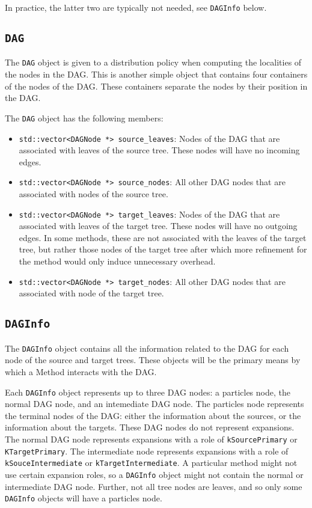 \noindent In practice, the latter two are typically not needed, see
\texttt{DAGInfo} below.


\subsection{\texttt{DAG}}

The \texttt{DAG} object is given to a distribution policy when computing the
localities of the nodes in the DAG. This is another simple object that contains
four containers of the nodes of the DAG. These containers separate the nodes
by their position in the DAG.

The \texttt{DAG} object has the following members:

\begin{itemize}
  \item \texttt{std::vector<DAGNode *> source\_leaves}: Nodes of the DAG that
    are associated with leaves of the source tree. These nodes will have no
    incoming edges.
  \item \texttt{std::vector<DAGNode *> source\_nodes}: All other DAG nodes that
    are associated with nodes of the source tree.
  \item \texttt{std::vector<DAGNode *> target\_leaves}: Nodes of the DAG that are
    associated with leaves of the target tree. These nodes will have no outgoing
    edges. In some methods, these are not associated with the leaves of the
    target tree, but rather those nodes of the target tree after which more
    refinement for the method would only induce unnecessary overhead.
  \item \texttt{std::vector<DAGNode *> target\_nodes}: All other DAG nodes that
    are associated with node of the target tree.
\end{itemize}


\subsection{\texttt{DAGInfo}}

The \texttt{DAGInfo} object contains all the information related to the DAG
for each node of the source and target trees. These objects will be the
primary means by which a Method interacts with the DAG.

Each \texttt{DAGInfo} object represents up to three DAG nodes: a particles
node, the normal DAG node, and an intemediate DAG node. The particles node
represents the terminal nodes of the DAG: either the information about
the sources, or the information about the targets. These DAG nodes do not
represent expansions. The normal
DAG node represents expansions with a role of \texttt{kSourcePrimary} or
\texttt{KTargetPrimary}. The intermediate node represents expansions with a
role of \texttt{kSouceIntermediate} or \texttt{kTargetIntermediate}. A
particular method might not use certain expansion roles, so a
\texttt{DAGInfo} object might not contain the normal or intermediate DAG node.
Further, not all tree nodes are leaves, and so only some \texttt{DAGInfo}
objects will have a particles node.

